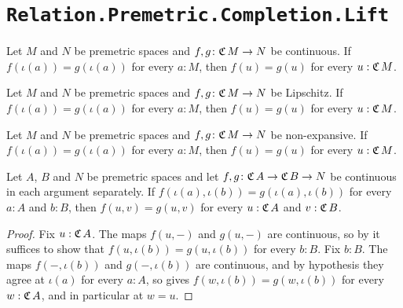 \section{\texttt{Relation.Premetric.Completion.Lift}}

\begin{theorem}
  \label{continuousEq}
  Let $M$ and $N$ be premetric spaces and $f, g \colon \mathfrak{C}\,M \to N$ be continuous. If $f(\iota(a)) = g(\iota(a))$ for every $a : M$, then $f(u) = g(u)$ for every $u : \mathfrak{C}\,M$.
\end{theorem}

\begin{corollary}
  \label{lipschitzEq}
  Let $M$ and $N$ be premetric spaces and $f, g \colon \mathfrak{C}\,M \to N$ be Lipschitz. If $f(\iota(a)) = g(\iota(a))$ for every $a : M$, then $f(u) = g(u)$ for every $u : \mathfrak{C}\,M$.
\end{corollary}

\begin{corollary}
  \label{nonExpansiveEq}
  Let $M$ and $N$ be premetric spaces and $f, g \colon \mathfrak{C}\,M \to N$ be non-expansive. If $f(\iota(a)) = g(\iota(a))$ for every $a : M$, then $f(u) = g(u)$ for every $u : \mathfrak{C}\,M$.
\end{corollary}

\begin{lemma}
  \label{continuous2Eq}
  Let $A$, $B$ and $N$ be premetric spaces and let $f, g \colon \mathfrak{C}\,A \to \mathfrak{C}\,B \to N$ be continuous in each argument separately. If $f(\iota(a), \iota(b)) = g(\iota(a), \iota(b))$ for every $a : A$ and $b : B$, then $f(u, v) = g(u, v)$ for every $u : \mathfrak{C}\,A$ and $v : \mathfrak{C}\,B$.
\end{lemma}
\begin{proof}
  Fix $u : \mathfrak{C}\,A$. The maps $f(u, -)$ and $g(u, -)$ are continuous, so by  it suffices to show that $f(u, \iota(b)) = g(u, \iota(b))$ for every $b : B$. Fix $b : B$. The maps $f(-, \iota(b))$ and $g(-, \iota(b))$ are continuous, and by hypothesis they agree at $\iota(a)$ for every $a : A$, so  gives $f(w, \iota(b)) = g(w, \iota(b))$ for every $w : \mathfrak{C}\,A$, and in particular at $w = u$.
\end{proof}


